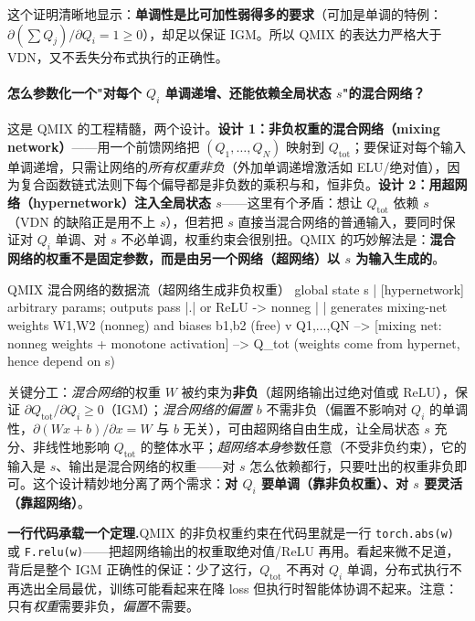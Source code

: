 这个证明清晰地显示：\textbf{单调性是比可加性弱得多的要求}（可加是单调的特例：$\partial(\sum Q_j)/\partial Q_i=1\ge0$），却足以保证 IGM。所以 QMIX 的表达力严格大于 VDN，又不丢失分布式执行的正确性。

\paragraph{怎么参数化一个"对每个 $Q_i$ 单调递增、还能依赖全局状态 $s$"的混合网络？} 这是 QMIX 的工程精髓，两个设计。\textbf{设计 1：非负权重的混合网络（mixing network）}——用一个前馈网络把 $(Q_1,\dots,Q_N)$ 映射到 $Q_{\text{tot}}$；要保证对每个输入单调递增，只需让网络的\emph{所有权重非负}（外加单调递增激活如 ELU/绝对值），因为复合函数链式法则下每个偏导都是非负数的乘积与和，恒非负。\textbf{设计 2：用超网络（hypernetwork）注入全局状态 $s$}——这里有个矛盾：想让 $Q_{\text{tot}}$ 依赖 $s$（VDN 的缺陷正是用不上 $s$），但若把 $s$ 直接当混合网络的普通输入，要同时保证对 $Q_i$ 单调、对 $s$ 不必单调，权重约束会很别扭。QMIX 的巧妙解法是：\textbf{混合网络的权重不是固定参数，而是由另一个网络（超网络）以 $s$ 为输入生成的}。

\begin{codebox}[text]{QMIX 混合网络的数据流（超网络生成非负权重）}
   global state s
       |
   [hypernetwork]    arbitrary params; outputs pass |.| or ReLU -> nonneg
       |
       | generates mixing-net weights W1,W2 (nonneg) and biases b1,b2 (free)
       v
Q1,...,QN --> [mixing net: nonneg weights + monotone activation] --> Q_tot
              (weights come from hypernet, hence depend on s)
\end{codebox}

关键分工：\emph{混合网络}的权重 $W$ 被约束为\textbf{非负}（超网络输出过绝对值或 ReLU），保证 $\partial Q_{\text{tot}}/\partial Q_i\ge0$（IGM）；\emph{混合网络的偏置 $b$} 不需非负（偏置不影响对 $Q_i$ 的单调性，$\partial(Wx+b)/\partial x=W$ 与 $b$ 无关），可由超网络自由生成，让全局状态 $s$ 充分、非线性地影响 $Q_{\text{tot}}$ 的整体水平；\emph{超网络本身}参数任意（不受非负约束），它的输入是 $s$、输出是混合网络的权重——对 $s$ 怎么依赖都行，只要吐出的权重非负即可。这个设计精妙地分离了两个需求：\textbf{对 $Q_i$ 要单调（靠非负权重）、对 $s$ 要灵活（靠超网络）}。

\begin{note}
\textbf{一行代码承载一个定理.}\;QMIX 的非负权重约束在代码里就是一行 \texttt{torch.abs(w)} 或 \texttt{F.relu(w)}——把超网络输出的权重取绝对值/ReLU 再用。看起来微不足道，背后是整个 IGM 正确性的保证：少了这行，$Q_{\text{tot}}$ 不再对 $Q_i$ 单调，分布式执行不再选出全局最优，训练可能看起来在降 loss 但执行时智能体协调不起来。注意：只有\emph{权重}需要非负，\emph{偏置}不需要。
\end{note}

